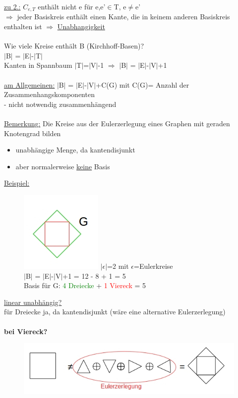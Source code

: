 \underline{zu 2.:} $C_{e,T}$ enthält nicht e für e,e'$\in$T, e$\neq$e'\\
$\Rightarrow$ jeder Basiskreis enthält einen Kante, die in keinem anderen Basiskreis enthalten ist $\Rightarrow$ \underline{Unabhangigkeit}
\\\\
Wie viele Kreise enthält B (Kirchhoff-Basen)?\\
$|$B$|$ = $|$E$|$-$|$T$|$\\
Kanten in Spannbaum $|$T$|$=$|$V$|$-1 $\Rightarrow$ $|$B$|$ = $|$E$|$-$|$V$|$+1
\\\\
\underline{am Allgemeinen:} $|$B$|$ = $|$E$|$-$|$V$|$+C(G) mit C(G)= Anzahl der Zusammenhangskomponenten\\
 - nicht notwendig zusammenhängend
\\\\
\underline{Bemerkung:} Die Kreise aus der Eulerzerlegung eines Graphen mit geraden Knotengrad bilden
\begin{itemize}
	\item unabhängige Menge, da kantendisjunkt
	\item aber normalerweise \underline{keine} Basis
\end{itemize}

\newpage
\underline{Beispiel:}
\begin{figure}[htp]
\centering
\includegraphics[scale=1.00]{lectures/161104/pix/pic7.jpg}
$| \epsilon |$=2 mit $\epsilon$=Eulerkreise\\
$|$B$|$ = $|$E$|$-$|$V$|$+1 = 12 - 8 + 1 = 5\\
Basis für G: \textcolor{green}{4 Dreiecke} + \textcolor{red}{1 Viereck} = 5
\end{figure}

\underline{linear unabhängig?}\\
für Dreiecke ja, da kantendisjunkt (wäre eine alternative Eulerzerlegung)
\\\\
\textbf{bei Viereck?}\\
\begin{figure}[htp]
\centering
\includegraphics[scale=1.00]{lectures/161104/pix/pic8.jpg}
\end{figure}

